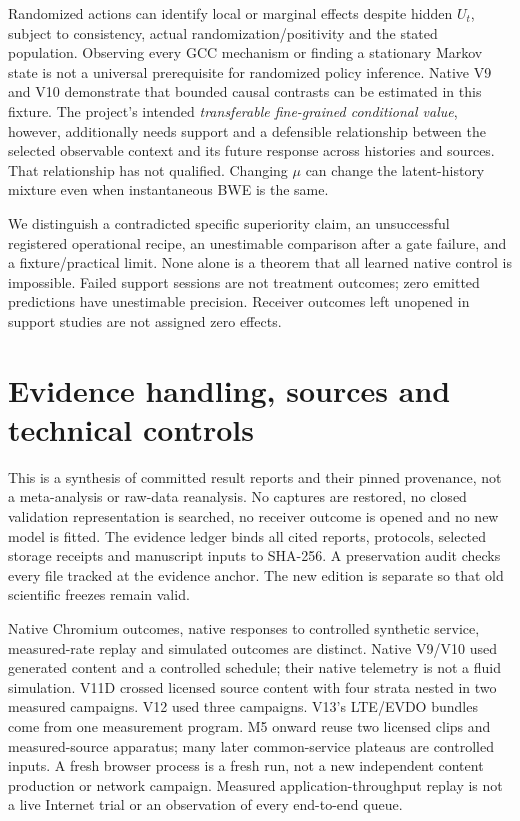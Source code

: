 \documentclass[10pt]{article}
\begin{document}
Randomized actions can identify local or marginal effects despite hidden
$U_t$, subject to consistency, actual randomization/positivity and the stated
population. Observing every GCC mechanism or finding a stationary Markov state
is not a universal prerequisite for randomized policy inference. Native V9 and
V10 demonstrate that bounded causal contrasts can be estimated in this fixture.
The project's intended \emph{transferable fine-grained conditional value},
however, additionally needs support and a defensible relationship between
the selected observable context and its future response across histories and
sources. That relationship has not qualified. Changing $\mu$ can change the
latent-history mixture even when instantaneous BWE is the same.

We distinguish a contradicted specific superiority claim, an unsuccessful
registered operational recipe, an unestimable comparison after a gate failure,
and a fixture/practical limit. None alone is a theorem that all learned native
control is impossible. Failed support sessions are not treatment outcomes;
zero emitted predictions have unestimable precision. Receiver outcomes left
unopened in support studies are not assigned zero effects.

\section{Evidence handling, sources and technical controls}
\label{sec:evidence}
This is a synthesis of committed result reports and their pinned provenance,
not a meta-analysis or raw-data reanalysis. No captures are restored, no closed
validation representation is searched, no receiver outcome is opened and no
new model is fitted. The evidence ledger binds all cited reports, protocols,
selected storage receipts and manuscript inputs to SHA-256. A preservation audit
checks every file tracked at the evidence anchor. The new edition is separate
so that old scientific freezes remain valid.

Native Chromium outcomes, native responses to controlled synthetic service,
measured-rate replay and simulated outcomes are distinct. Native V9/V10 used
generated content and a controlled schedule; their native telemetry is not a
fluid simulation. V11D crossed licensed source content with four strata nested
in two measured campaigns. V12 used three campaigns. V13's LTE/EVDO bundles
come from one measurement program. M5 onward reuse two licensed clips and
measured-source apparatus; many later common-service plateaus are controlled
inputs. A fresh browser process is a fresh run, not a new independent content
production or network campaign. Measured application-throughput replay is not
a live Internet trial or an observation of every end-to-end queue.
\end{document}
